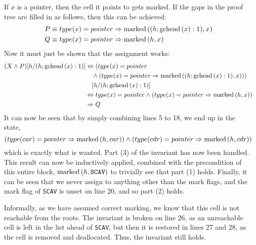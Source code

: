\begin{lemma}
  If $x$ is a pointer, then the cell it points to gets marked. If the
  gaps in the proof tree are filled in as follows, then this can be
  achieved:
  \begin{align*}
    P &\equiv type(x) = pointer \Rightarrow \mathrm{marked}\left((h; \mathrm{gchead}\left(x\right):1), x\right)\\
    Q &\equiv type(x) = pointer \Rightarrow \mathrm{marked}\left(h, x\right)
  \end{align*}
  Now it must just be shown that the assignment works:
  \begin{align*}
    (X \land P)[h/(h; \gchead{x}:1)] &\iff (type(x) = pointer\\
    &\quad\land (type(x) = pointer \implies \marked{(h;
      \gchead{x}:1)}{x}))\\
    &\quad[h/(h; \gchead{x}:1)]\\
%
    &\iff type(x) = pointer \land (type(x) = pointer \implies
    \marked{h}{x})\\
%
    &\implies Q
  \end{align*}
  It can now be seen that by simply combining lines 5 to 18, we end up
  in the state, \[(type(car) = pointer \Rightarrow \mathrm{marked}\left(h, car\right)) \land
  (type(cdr) = pointer \Rightarrow \mathrm{marked}\left(h, cdr\right))\] which is exactly
  what is wanted. Part (3) of the invariant has now been handled. This
  result can now be inductively applied, combined with the
  precondition of this entire block, $\mathrm{marked}\left(h, \mathtt{SCAV}\right)$ to
  trivially see that part (1) holds. Finally, it can be seen that we
  never assign to anything other than the mark flags, and the mark
  flag of \texttt{SCAV} is unset on line 20, and so part (2) holds.
  \label{lem:lia}
\end{lemma}

\begin{lemma}
  Informally, as we have assumed correct marking, we know that this
  cell is not reachable from the roots. The invariant is broken on
  line 26, as an unreachable cell is left in the list ahead of
  \texttt{SCAV}, but then it is restored in lines 27 and 28, as the
  cell is removed and deallocated. Thus, the invariant still holds.
  \label{lem:lib}
\end{lemma}

